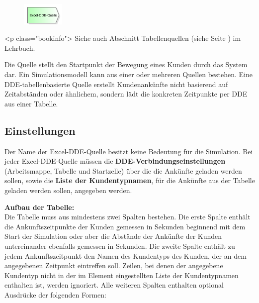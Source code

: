 \begin{figure}
\vspace{-22pt}
\includegraphics[width=2cm]{imageModelElementSourceDDE.png}
\vspace{-22pt}
\end{figure}

<p class="bookinfo">
Siehe auch Abschnitt Tabellenquellen (siehe Seite \pageref{ref:book:9.3.1}) im Lehrbuch.

Die Quelle stellt den Startpunkt der Bewegung eines Kunden durch das System dar.
Ein Simulationsmodell kann aus einer oder mehreren Quellen bestehen.
Eine DDE-tabellenbasierte Quelle erstellt Kundenankünfte nicht basierend auf
Zeitabständen oder ähnlichem, sondern lädt die konkreten Zeitpunkte per DDE
aus einer Tabelle.

\subsection*{Einstellungen}

Der Name der Excel-DDE-Quelle besitzt keine Bedeutung für die Simulation.
Bei jeder Excel-DDE-Quelle müssen die \textbf{DDE-Verbindungseinstellungen}
(Arbeitsmappe, Tabelle und Startzelle) über die die Ankünfte geladen werden sollen,
sowie die \textbf{Liste der Kundentypnamen},
für die Ankünfte aus der Tabelle geladen werden sollen, angegeben werden.

\textbf{Aufbau der Tabelle:}~\\
Die Tabelle muss aus mindestens zwei Spalten bestehen. Die erste Spalte enthält die Ankunftszeitpunkte
der Kunden gemessen in Sekunden beginnend mit dem Start der Simulation oder aber die Abstände
der Ankünfte der Kunden untereinander ebenfalls gemessen in Sekunden. Die zweite Spalte
enthält zu jedem Ankunftszeitpunkt den Namen des Kundentyps des Kunden, der an dem
angegebenen Zeitpunkt eintreffen soll. Zeilen, bei denen der angegebene Kundentyp
nicht in der im Element eingestellten Liste der Kundentypnamen enthalten ist, werden ignoriert.
Alle weiteren Spalten enthalten optional Ausdrücke der folgenden Formen:

